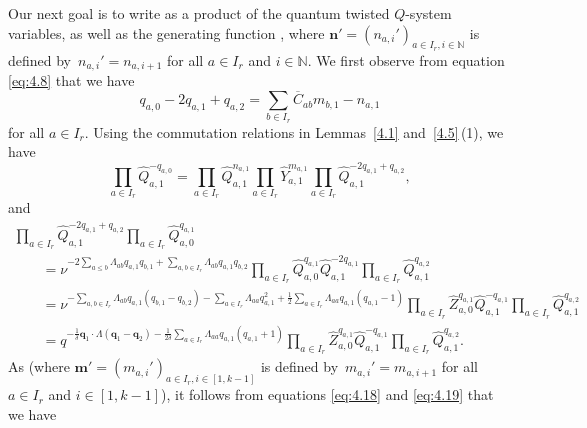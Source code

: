 \documentclass[10pt,a4paper]{amsart}
\numberwithin{equation}{section}
\begin{document}
Our next goal is to write  as a product of the quantum twisted $Q$-system variab\-les, as well as the generating function , where $\mathbf{n}'=(n_{a,i}')_{a\in I_r,i\in\mathbb{N}}$ is \mbox{defined} by~${n_{a,i}'=n_{a,i+1}}$ for all $a\in I_r$ and $i\in\mathbb{N}$. We first observe from equation \eqref{eq:4.8} that we have
\begin{equation*}
q_{a,0}-2q_{a,1}+q_{a,2}=\sum_{b\in I_r}\overline{C}_{ab}m_{b,1}-n_{a,1}
\end{equation*}
for all $a\in I_r$. Using the commutation relations in Lemmas~\ref{4.1} and~\ref{4.5}\,(1), we have
\begin{equation}\label{eq:4.18}
\prod_{a\in I_r}\widehat{Q}_{a,1}^{-q_{a,0}}
=\prod_{a\in I_r}\widehat{Q}_{a,1}^{n_{a,1}}\prod_{a\in I_r}\widehat{Y}_{a,1}^{m_{a,1}}\prod_{a\in I_r}\widehat{Q}_{a,1}^{-2q_{a,1}+q_{a,2}},
\end{equation}
and
\begin{gather}
\prod_{a\in I_r}\widehat{Q}_{a,1}^{-2q_{a,1}+q_{a,2}}\prod_{a\in I_r}\widehat{Q}_{a,0}^{q_{a,1}}\nonumber\\
\qquad=\nu^{-2\sum_{a\leq b}\Lambda_{ab}q_{a,1}q_{b,1}+\sum_{a,b\in I_r}\Lambda_{ab}q_{a,1}q_{b,2}}\prod_{a\in I_r}\widehat{Q}_{a,0}^{q_{a,1}}\widehat{Q}_{a,1}^{-2q_{a,1}}\prod_{a\in I_r}\widehat{Q}_{a,1}^{q_{a,2}}\nonumber\\
\qquad=\nu^{-\sum_{a,b\in I_r}\Lambda_{ab}q_{a,1}(q_{b,1}-q_{b,2})-\sum_{a\in I_r}\Lambda_{aa}q_{a,1}^2+\frac{1}{2}\sum_{a\in I_r}\Lambda_{aa}q_{a,1}(q_{a,1}-1)}\prod_{a\in I_r}\widehat{Z}_{a,0}^{q_{a,1}}\widehat{Q}_{a,1}^{-q_{a,1}}\prod_{a\in I_r}\widehat{Q}_{a,1}^{q_{a,2}}\nonumber\\
\qquad=q^{-\frac{1}{\delta}\mathbf{q}_1\cdot\Lambda(\mathbf{q}_1-\mathbf{q}_2)-\frac{1}{2\delta}\sum_{a\in I_r}\Lambda_{aa}q_{a,1}(q_{a,1}+1)}\prod_{a\in I_r}\widehat{Z}_{a,0}^{q_{a,1}}\widehat{Q}_{a,1}^{-q_{a,1}}\prod_{a\in I_r}\widehat{Q}_{a,1}^{q_{a,2}}.\label{eq:4.19}
\end{gather}
As  (where $\mathbf{m}'=(m_{a,i}')_{a\in I_r,i\in[1,k-1]}$ is defined by~${m_{a,i}'= m_{a,i+1}}$ for all $a\in I_r$ and $i\in[1,k-1]$), it follows from equations \eqref{eq:4.18} and \eqref{eq:4.19} that we have
\end{document}
